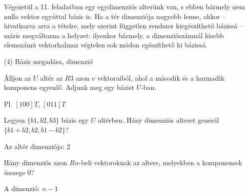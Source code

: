 \begin{frame}
\begin{tcolorbox}[title={3/11. -Q-}]
Végezetül a 11. feladatban egy egydimenziós alterünk van, s ebben bármely nem nulla vektor egyúttal bázis is. Ha a tér dimenziója nagyobb lenne, akkor – hivatkozva arra a tételre, mely szerint független rendszer kiegészíthető bázissá – máris megváltozna a helyzet: ilyenkor bármely, a dimenziószámnál kisebb elemszámú vektorhalmaz végtelen sok módon egészíthető ki bázissá.

  \end{tcolorbox}
\end{frame}



\begin{frame}[plain]
\begin{tcolorbox}[center, colback={myyellow}, coltext={black}, colframe={myyellow}]
    {\RHuge  (4) Bázis megadása, dimenzió}
    \mmedskip
\end{tcolorbox}
\end{frame}

\begin{frame}
  \begin{tcolorbox}[title={4/1. -N-}]
      Álljon az $U$ altér az $R3$ azon $v$ vektoraiból, ahol a második és a harmadik komponens egyenlő. Adjunk meg egy bázist $U$-ban.
  \tcblower

    \mmedskip 
    
    Pl. $[1 0 0]T$, $[0 1 1]T$
  \end{tcolorbox}
\end{frame}


\begin{frame}
  \begin{tcolorbox}[title={4/2. -N-}]
      Legyen $\{b1,b2,b3\}$ bázis egy $U$ altérben. Hány dimenziós alteret generál $\{b1 + b2,b2,b1 −b2\}$?
  \tcblower

    \mmedskip 
    
    Az altér dimenziója: 2
  \end{tcolorbox}
\end{frame}


\begin{frame}
  \begin{tcolorbox}[title={4/3. -R-}]
      Hány dimenziós azon $Rn$-beli vektoroknak az altere, melyekben a komponensek összege $0$?
  \tcblower

    \mmedskip 
    
    A dimenzió: $n−1$
  \end{tcolorbox}
\end{frame}


